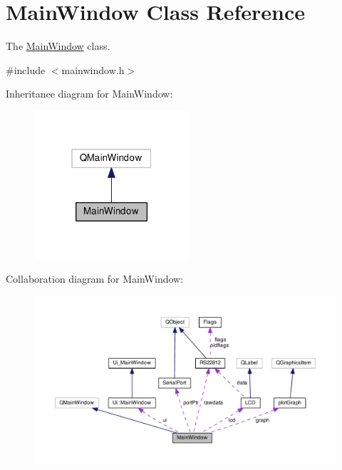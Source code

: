 \hypertarget{class_main_window}{\section{Main\-Window Class Reference}
\label{class_main_window}
}


The \hyperlink{class_main_window}{Main\-Window} class.  




{\ttfamily \#include $<$mainwindow.\-h$>$}



Inheritance diagram for Main\-Window\-:\nopagebreak
\begin{figure}[H]
\begin{center}
\leavevmode
\includegraphics[width=163pt]{class_main_window__inherit__graph}
\end{center}
\end{figure}


Collaboration diagram for Main\-Window\-:\nopagebreak
\begin{figure}[H]
\begin{center}
\leavevmode
\includegraphics[width=350pt]{class_main_window__coll__graph}
\end{center}
\end{figure}
